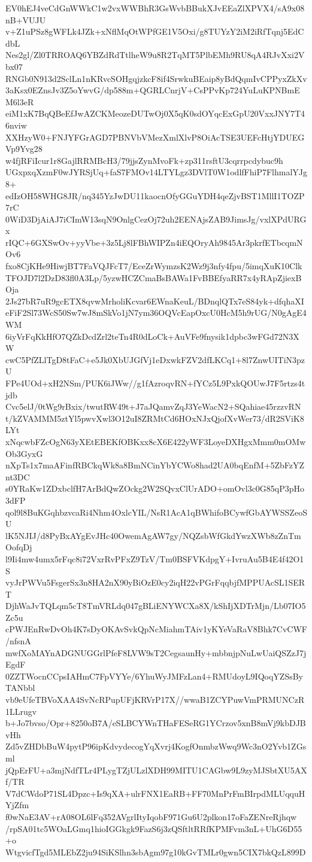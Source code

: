 EV0hEJ4veCdGnWWkC1w2vxWWBhR3GsWvbBBukXJvEEaZlXPVX4/sA9x08nB+VUJU
v+Z1uPSz8gWFLk4JZk+xNflMqOtWPfGE1V5Oxi/g8TUYzY2iM2iRfTqnj5EdCdbL
Nes2gl/Zl0TRROAQ6YBZdRdTtlheW9u8R2TqMT5PlbEMh9RU8qA4RJvXxi2Vbx07
RNGb0N913d2SclLn1nKRvcSOHgqjzkcF8if4SrwkuBEaip8yBdQqmIvCPPyxZkXv
3aKsx0EZnsJv3Z5oYwvG/dp588m+QGRLCnrjV+CsPPvKp724YuLuKPNBmEM6l3eR
eiM1xK7BqQBeEfJwAZCKMeozeDUTwOj0X5qK0sdOYqcExGpU20VxxJNY7T46nviw
XXHzyW0+FNJYFGrAGD7PBNVbVMezXmlXlvP8OiAcTSE3UEFcHtjYDUEGVp9Yvg28
w4fjRFiIcur1r8GajlRRMBcH3/79jjsZynMvoFk+zp311rsftU3cqrrpcdybuc9h
UGxpxqXzmF0wJYRSjUq+faS7FMOv14LTYLgz3DVlT0W1odlfFhiP7FlhmalYJg8+
edIzOH58WHG8JR/nq345YzJwDU11kaocnOfyGGuYDH4qeZjvBST1MllI1TOZP7rC
0WiD3DjAiAJ7iCImW13sqN9OnlgCezOj72uh2EENAjsZAB9JimsJg/vxlXPdURGx
rIQC+6GXSwOv+yyVbe+3z5Lj8lFBhWIPZn4iEQOryAh9845Ar3pkrfETbcqmNOv6
fxo8CjKHe9HiwjBT7FaVQJFcT7/EceZrWymzsK2Wz9j3nfy4fpu/5imqXuK10Clk
TFOJD7l2DzD83fl0A3Lp/5yzwHCZCmaBsBAWa1FvBBEfyaRR7x4yRApZjiexBOja
2Js27bR7uR9gcETX8qvwMrholiKcvar6EWnaKeuL/BDnqlQTx7eS84yk+dfqhaXI
eFiF2Sl73WcS50Sw7wJ8mSkVo1jN7ym36OQVcEapOxcU0HcM5h9rUG/N0gAgE4WM
6iyVrFqKkHfO7QZkDcdZrl2teTn4R0dLoCk+AuVFe9fnysik1dpbc3wFGd72N3XW
cwC5PfZLlTgD8tFaC+e5Jk0XbUJGfVj1eDxwkFZV2dfLKCq1+8l7ZnwUITiN3pzU
FPe4UOd+xH2NSm/PUK6iJWw//g1fAzroqvRN+fYCz5L9PxkQOUwJ7F5rtzs4tjdb
Cvc5elJ/0tWg9rBxix/twutRW49t+J7aJQamvZqJ3YeWacN2+SQahiae45rzzvRN
t/kZVAMMM5ztYl5pwvXwl3O12uI8ZRMtCd6HOxNJxQjofXvWer73/dR2SViK8LYt
xNqcwbFZcOgN63yXEtEBEKfOBKxx8cX6E422yWF3LoyeDXHgxMmm0mOMwOb3GyxG
nXpTs1x7maAFinfRBCkqWk8a8BmNCinYbYCWo8had2UA0bqEnfM+5ZbFzYZnt3DC
s0YRaKw1ZDxbclfH7ArBdQwZOckg2W2SQvxClUrADO+omOvl3c0G85qP3pHo3dFP
qol9l8BuKGqhbzvcaRi4Nhm4OxlcYIL/NsR1AcA1qBWhifoBCywfGbAYWSSZeoSU
lK5NJIJ/d8PyBxAYgEvJHc40OwemAgAW7gy/NQZsbWfGkdYwzXWb8zZnTmOofqDj
l9Ii4mw4umx5rFqc8i72VxrRvPFxZ9TzV/Tm0BSFVKdpgY+IvruAu5B4E4f42O1S
vyJrPWVu5FsgerSx3n8HA2nX90yBiOzE0cy2iqH22vPGrFqqbjfMPPUAcSL1SERT
DjhWaJvTQLqm5cT8TmVRLdq047gBLiENYWCXa8X/kShIjXDTrMjn/Lb07IO5Zc5u
cPWJEnRwDvOh4K7sDyOKAvSvkQpNcMiahmTAiv1yKYeVaRaV8Bhk7CvCWF/nfsnA
mwfXoMAYnADGNUGGrlPfeF8LVW9sT2CegsaunHy+mbbnjpNuLwUaiQSZzJ7jEgdF
0ZZTWocnCCpsIAHmC7FpVYYe/6YhuWyJMFzLan4+RMUdoyL9IQoqYZSsByTANbbl
vb9eUfeTBVoXAA4SvNcRPupUFjKRVrP17X//wwaB1ZCYPuwVmPRMUNCzR1LLrugv
b+Jo7bvso/Opr+8250oB7A/eSLBCYWnTHaFESeRG1YCrzov5xnB8mVj9kbDJBvHh
Zd5vZHDbBuW4pytP96ipKdvydecogYqXvrj4KogfOnmbzWwq9Wc3nO2Yvb1ZGsml
jQpErFU+a3mjNdfTLr4PLygTZjULzlXDH99MITU1CAGbw9L9zyMJSbtXU5AXf/TR
V7dCWdoP71SL4Dpzc+Is9qXA+ulrFNX1EaRB+FF70MnPrFmBIrpdMLUqquHYjZfm
f0wNaE3AV+rA08OL6lFq352AVgrlItyIqobF971Gu6U2plkon17oFaZENreRjhqw
/rpSA01tc5WOaLGmq1hioIGGkgk9FazS6j3zQSftltRRfKPMFvm3nL+UhG6D55+o
WtgvicfTgd5MLEbZ2ju94SiKSlhn3sbAgm97g10kGvTMLr0gwn5CIX7bkQzL899D
